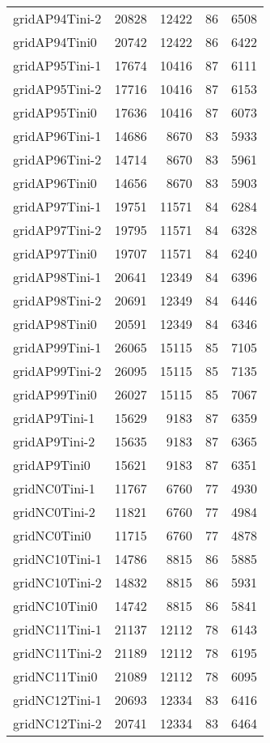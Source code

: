 \begin{longtable}{lrrrr}
gridAP94Tini-2 & 20828 & 12422 & 86 & 6508 \\
gridAP94Tini0 & 20742 & 12422 & 86 & 6422 \\
gridAP95Tini-1 & 17674 & 10416 & 87 & 6111 \\
gridAP95Tini-2 & 17716 & 10416 & 87 & 6153 \\
gridAP95Tini0 & 17636 & 10416 & 87 & 6073 \\
gridAP96Tini-1 & 14686 & 8670 & 83 & 5933 \\
gridAP96Tini-2 & 14714 & 8670 & 83 & 5961 \\
gridAP96Tini0 & 14656 & 8670 & 83 & 5903 \\
gridAP97Tini-1 & 19751 & 11571 & 84 & 6284 \\
gridAP97Tini-2 & 19795 & 11571 & 84 & 6328 \\
gridAP97Tini0 & 19707 & 11571 & 84 & 6240 \\
gridAP98Tini-1 & 20641 & 12349 & 84 & 6396 \\
gridAP98Tini-2 & 20691 & 12349 & 84 & 6446 \\
gridAP98Tini0 & 20591 & 12349 & 84 & 6346 \\
gridAP99Tini-1 & 26065 & 15115 & 85 & 7105 \\
gridAP99Tini-2 & 26095 & 15115 & 85 & 7135 \\
gridAP99Tini0 & 26027 & 15115 & 85 & 7067 \\
gridAP9Tini-1 & 15629 & 9183 & 87 & 6359 \\
gridAP9Tini-2 & 15635 & 9183 & 87 & 6365 \\
gridAP9Tini0 & 15621 & 9183 & 87 & 6351 \\
gridNC0Tini-1 & 11767 & 6760 & 77 & 4930 \\
gridNC0Tini-2 & 11821 & 6760 & 77 & 4984 \\
gridNC0Tini0 & 11715 & 6760 & 77 & 4878 \\
gridNC10Tini-1 & 14786 & 8815 & 86 & 5885 \\
gridNC10Tini-2 & 14832 & 8815 & 86 & 5931 \\
gridNC10Tini0 & 14742 & 8815 & 86 & 5841 \\
gridNC11Tini-1 & 21137 & 12112 & 78 & 6143 \\
gridNC11Tini-2 & 21189 & 12112 & 78 & 6195 \\
gridNC11Tini0 & 21089 & 12112 & 78 & 6095 \\
gridNC12Tini-1 & 20693 & 12334 & 83 & 6416 \\
gridNC12Tini-2 & 20741 & 12334 & 83 & 6464 \\

\end{longtable}
